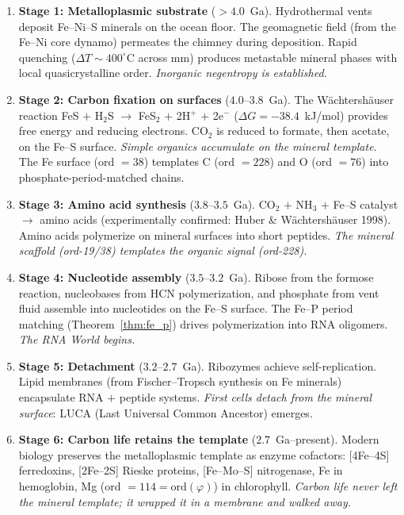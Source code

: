 \begin{enumerate}
    \item \textbf{Stage 1: Metalloplasmic substrate} ($> 4.0$~Ga). Hydrothermal vents deposit Fe--Ni--S minerals on the ocean floor. The geomagnetic field (from the Fe--Ni core dynamo) permeates the chimney during deposition. Rapid quenching ($\Delta T \sim 400^\circ$C across mm) produces metastable mineral phases with local quasicrystalline order. \emph{Inorganic negentropy is established.}

    \item \textbf{Stage 2: Carbon fixation on surfaces} ($4.0$--$3.8$~Ga). The W\"achtersh\"auser reaction FeS $+$ H$_2$S $\to$ FeS$_2$ $+$ 2H$^+$ $+$ 2e$^-$ ($\Delta G = -38.4$~kJ/mol) provides free energy and reducing electrons. CO$_2$ is reduced to formate, then acetate, on the Fe--S surface. \emph{Simple organics accumulate on the mineral template.} The Fe surface (ord $= 38$) templates C (ord $= 228$) and O (ord $= 76$) into phosphate-period-matched chains.

    \item \textbf{Stage 3: Amino acid synthesis} ($3.8$--$3.5$~Ga). CO$_2$ $+$ NH$_3$ $+$ Fe--S catalyst $\to$ amino acids (experimentally confirmed: Huber \& W\"achtersh\"auser 1998). Amino acids polymerize on mineral surfaces into short peptides. \emph{The mineral scaffold (ord-19/38) templates the organic signal (ord-228).}

    \item \textbf{Stage 4: Nucleotide assembly} ($3.5$--$3.2$~Ga). Ribose from the formose reaction, nucleobases from HCN polymerization, and phosphate from vent fluid assemble into nucleotides on the Fe--S surface. The Fe--P period matching (Theorem~\ref{thm:fe_p}) drives polymerization into RNA oligomers. \emph{The RNA World begins.}

    \item \textbf{Stage 5: Detachment} ($3.2$--$2.7$~Ga). Ribozymes achieve self-replication. Lipid membranes (from Fischer--Tropsch synthesis on Fe minerals) encapsulate RNA $+$ peptide systems. \emph{First cells detach from the mineral surface}: LUCA (Last Universal Common Ancestor) emerges.

    \item \textbf{Stage 6: Carbon life retains the template} ($2.7$~Ga--present). Modern biology preserves the metalloplasmic template as enzyme cofactors: [4Fe--4S] ferredoxins, [2Fe--2S] Rieske proteins, [Fe--Mo--S] nitrogenase, Fe in hemoglobin, Mg (ord $= 114 = \mathrm{ord}(\varphi)$) in chlorophyll. \emph{Carbon life never left the mineral template; it wrapped it in a membrane and walked away.}
\end{enumerate}

